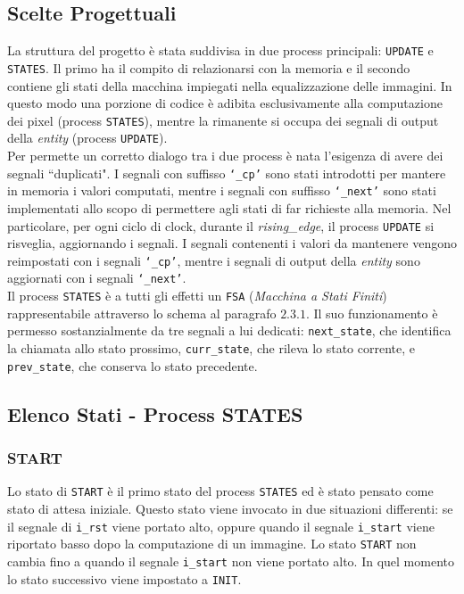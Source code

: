 \documentclass[11pt, a4paper]{article}
\begin{document}
\subsection{Scelte Progettuali}
La struttura del progetto è stata suddivisa in due process principali: \texttt{UPDATE} e \texttt{STATES}.
Il primo ha il compito di relazionarsi con la memoria e il secondo contiene gli stati della macchina impiegati nella equalizzazione delle immagini. In questo modo una porzione di codice è adibita esclusivamente alla computazione dei pixel (process \texttt{STATES}), mentre la rimanente si occupa dei segnali di output della \textit{entity} (process \texttt{UPDATE}).\\
Per permette un corretto dialogo tra i due process è nata l'esigenza di avere dei segnali ``duplicati".
I segnali con suffisso \texttt{\lq\_cp'} sono stati introdotti per mantere in memoria i valori computati, mentre i segnali con suffisso \texttt{\lq\_next'} sono stati implementati allo scopo di permettere agli stati di far richieste alla memoria.
Nel particolare, per ogni ciclo di clock, durante il \textit{rising\_edge}, il process \texttt{UPDATE} si risveglia, aggiornando i segnali. I segnali contenenti i valori da mantenere vengono reimpostati con i segnali \texttt{\lq\_cp'}, mentre i segnali di output della \textit{entity} sono aggiornati con i segnali \texttt{\lq\_next'}.\\
Il process \texttt{STATES} è a tutti gli effetti un \texttt{FSA} (\textit{Macchina a Stati Finiti}) rappresentabile attraverso lo schema al paragrafo $2.3.1$.
Il suo funzionamento è permesso sostanzialmente da tre segnali a lui dedicati: \texttt{next\_state}, che identifica la chiamata allo stato prossimo,  \texttt{curr\_state}, che rileva lo stato corrente, e \texttt{prev\_state}, che conserva lo stato precedente.

\subsection{Elenco Stati - Process STATES}

\subsubsection{START}
Lo stato di \texttt{START} è il primo stato del process \texttt{STATES} ed è stato pensato come stato di attesa iniziale. Questo stato viene invocato in due situazioni differenti: se il segnale di \texttt{i\_rst} viene portato alto, oppure quando il segnale \texttt{i\_start} viene riportato basso dopo la computazione di un immagine. Lo stato \texttt{START} non cambia fino a quando il segnale \texttt{i\_start} non viene portato alto. In quel momento lo stato successivo viene impostato a \texttt{INIT}.
\end{document}
